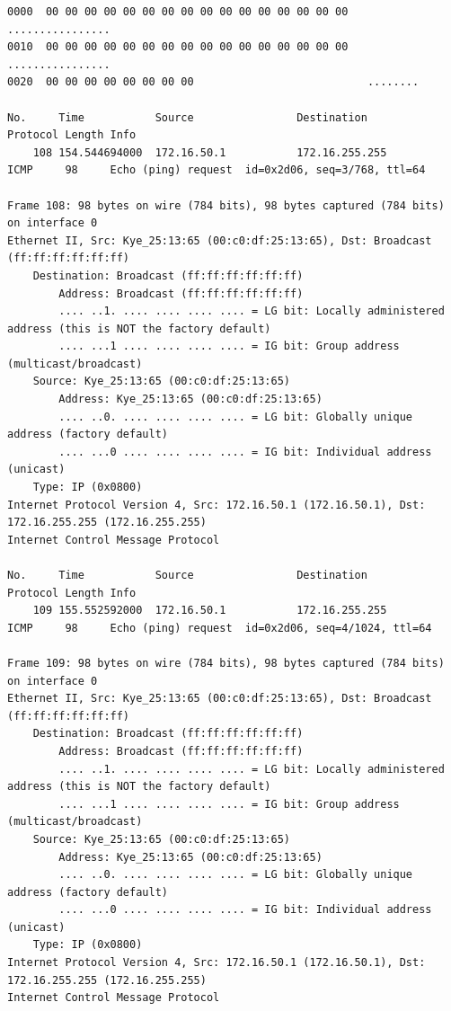 \documentclass[a4paper,11pt]{article}
\begin{document}
\begin{lstlisting}
0000  00 00 00 00 00 00 00 00 00 00 00 00 00 00 00 00   ................
0010  00 00 00 00 00 00 00 00 00 00 00 00 00 00 00 00   ................
0020  00 00 00 00 00 00 00 00                           ........

No.     Time           Source                Destination           Protocol Length Info
    108 154.544694000  172.16.50.1           172.16.255.255        ICMP     98     Echo (ping) request  id=0x2d06, seq=3/768, ttl=64

Frame 108: 98 bytes on wire (784 bits), 98 bytes captured (784 bits) on interface 0
Ethernet II, Src: Kye_25:13:65 (00:c0:df:25:13:65), Dst: Broadcast (ff:ff:ff:ff:ff:ff)
    Destination: Broadcast (ff:ff:ff:ff:ff:ff)
        Address: Broadcast (ff:ff:ff:ff:ff:ff)
        .... ..1. .... .... .... .... = LG bit: Locally administered address (this is NOT the factory default)
        .... ...1 .... .... .... .... = IG bit: Group address (multicast/broadcast)
    Source: Kye_25:13:65 (00:c0:df:25:13:65)
        Address: Kye_25:13:65 (00:c0:df:25:13:65)
        .... ..0. .... .... .... .... = LG bit: Globally unique address (factory default)
        .... ...0 .... .... .... .... = IG bit: Individual address (unicast)
    Type: IP (0x0800)
Internet Protocol Version 4, Src: 172.16.50.1 (172.16.50.1), Dst: 172.16.255.255 (172.16.255.255)
Internet Control Message Protocol

No.     Time           Source                Destination           Protocol Length Info
    109 155.552592000  172.16.50.1           172.16.255.255        ICMP     98     Echo (ping) request  id=0x2d06, seq=4/1024, ttl=64

Frame 109: 98 bytes on wire (784 bits), 98 bytes captured (784 bits) on interface 0
Ethernet II, Src: Kye_25:13:65 (00:c0:df:25:13:65), Dst: Broadcast (ff:ff:ff:ff:ff:ff)
    Destination: Broadcast (ff:ff:ff:ff:ff:ff)
        Address: Broadcast (ff:ff:ff:ff:ff:ff)
        .... ..1. .... .... .... .... = LG bit: Locally administered address (this is NOT the factory default)
        .... ...1 .... .... .... .... = IG bit: Group address (multicast/broadcast)
    Source: Kye_25:13:65 (00:c0:df:25:13:65)
        Address: Kye_25:13:65 (00:c0:df:25:13:65)
        .... ..0. .... .... .... .... = LG bit: Globally unique address (factory default)
        .... ...0 .... .... .... .... = IG bit: Individual address (unicast)
    Type: IP (0x0800)
Internet Protocol Version 4, Src: 172.16.50.1 (172.16.50.1), Dst: 172.16.255.255 (172.16.255.255)
Internet Control Message Protocol


\end{lstlisting}
\end{document}
